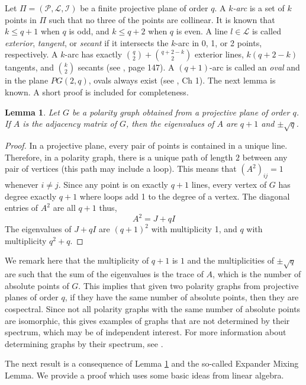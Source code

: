 \documentclass[12pt]{article}
\newtheorem{lemma}[theorem]{Lemma}
\begin{document}
Let $\Pi = ( \mathcal{P} , \mathcal{L} , \mathcal{I} )$ be a finite projective plane of order $q$.  A {\em $k$-arc} is a set of $k$ points
in $\Pi$ such that no three of the points are collinear.  It is known that $k \leq q +1$ when $q$ is odd, and $k \leq q + 2$ when $q$ is even.  A line $l \in \mathcal{L}$ is called {\em exterior}, {\em tangent}, or {\em secant} if it intersects the $k$-arc in 0, 1, or 2 points, respectively.  A $k$-arc has exactly $\binom{q}{2} + \binom{q + 2 - k }{2}$ exterior lines, $k ( q+ 2 - k )$ tangents, and $\binom{k}{2}$ secants (see \cite{dembowski1968finite}, page 147).  A $(q+1)$-arc is called an {\em oval} and in the plane $PG(2,q)$, ovals always exist (see \cite{dembowski1968finite}, Ch 1).  The next lemma is known.  A short proof is included for completeness.

\begin{lemma}\label{eigen of graph}
    Let $G$ be a polarity graph obtained from a projective plane of order $q$.  If $A$ is the adjacency matrix of $G$, then the eigenvalues of $A$ are $q+1$ and $\pm \sqrt{q}$.
\end{lemma}


\begin{proof}
    In a projective plane, every pair of points is contained in a unique line. Therefore, in a polarity graph, there is a unique path of length $2$ between any pair of vertices (this path may include a loop). This means that $(A^2)_{ij} = 1$ whenever $i\not=j$. Since any point is on exactly $q+1$ lines, every vertex of $G$ has degree exactly $q+1$ where loops add 1 to the degree of a vertex. The diagonal entries of $A^2$ are all $q+1$ thus,
    $$ A^2 = J + qI $$
    The eigenvalues of $J+qI$ are $(q+1)^2$ with multiplicity 1, and $q$ with multiplicity $q^2 + q$.
\end{proof}

We remark here that the multiplicity of $q+1$ is $1$ and the multiplicities of $\pm \sqrt{q}$ are such that the sum of the eigenvalues is the trace of $A$, which is the number of absolute points of $G$. This implies that given two polarity graphs from projective planes of order $q$, if they have the same number of absolute points, then they are cospectral. Since not all polarity graphs with the same number of absolute points are isomorphic, this gives examples of graphs that are not determined by their spectrum, which may be of independent interest. For more information about determining graphs by their spectrum, see \cite{van2003graphs}.


The next result is a consequence of Lemma \ref{eigen of graph} and the so-called Expander Mixing Lemma.
We provide a proof which uses some basic ideas from linear algebra.
\end{document}
